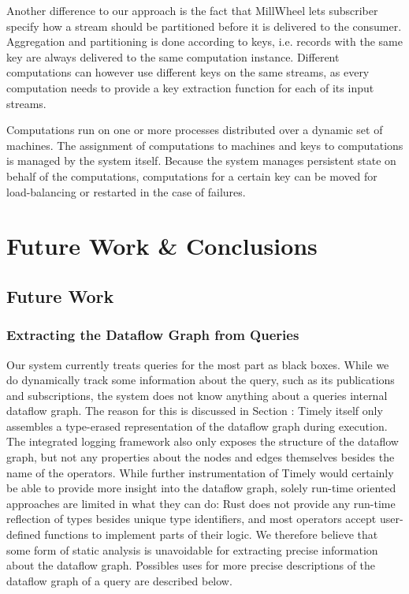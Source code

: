 Another difference to our approach is the fact that MillWheel lets subscriber
specify how a stream should be partitioned before it is delivered to the consumer.
Aggregation and partitioning is done according to keys, i.e. records with the
same key are always delivered to the same computation instance. Different
computations can however use different keys on the same streams, as every computation
needs to provide a key extraction function for each of its input streams.

Computations run on one or more processes distributed over a dynamic set of
machines. The assignment of computations to machines and keys to computations
is managed by the system itself. Because the system manages persistent state
on behalf of the computations, computations for a certain key can be moved
for load-balancing or restarted in the case of failures.

\cleardoublepage
\chapter{Future Work \& Conclusions} \label{ch:future}

\section{Future Work}

\subsection{Extracting the Dataflow Graph from Queries}

Our system currently treats queries for the most part as black boxes. While we
do dynamically track some information about the query, such as its publications
and subscriptions, the system does not know anything about a queries internal
dataflow graph. The reason for this is discussed in Section :
Timely itself only assembles a type-erased representation of the dataflow graph
during execution. The integrated logging framework also only exposes the
structure of the dataflow graph, but not any properties about the nodes and
edges themselves besides the name of the operators. While further instrumentation
of Timely would certainly be able to provide more insight into the dataflow
graph, solely run-time oriented approaches are limited in what they can do:
Rust does not provide any run-time reflection of types besides unique type
identifiers, and most operators accept user-defined functions to implement
parts of their logic. We therefore believe that some form of static analysis
is unavoidable for extracting precise information about the dataflow graph.
Possibles uses for more precise descriptions of the dataflow graph of a query
are described below.

